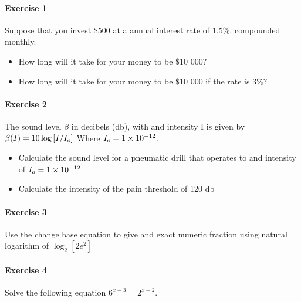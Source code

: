 \documentclass{tufte-handout}
\begin{document}
\paragraph{Exercise 1}
Suppose that you invest \$500 at a annual interest rate of 1.5\%, compounded monthly. 
\begin{itemize}
    \item How long will it take for your money to be \$10 000?
    \item How long will it take for your money to be \$10 000 if the rate is 3\%?
\end{itemize}

\noindent\makebox[\linewidth]{\rule{\textwidth}{0.4pt}}

\paragraph{Exercise 2}
The sound level $\beta$ in decibels (db), with and intensity I is given by $\beta(I)=10\log\qty[I/I_o]$ Where $I_o=\num{1d-12}$.
\begin{itemize}
    \item Calculate the sound level for a pneumatic drill that operates to and intensity of $I_o=\num{1d-12}$
    \item Calculate the intensity of the pain threshold of 120 db
\end{itemize}

\noindent\makebox[\linewidth]{\rule{\textwidth}{0.4pt}}

\paragraph{Exercise 3}
Use the change base equation to give and exact numeric fraction using natural logarithm of $\log_2[2e^2]$

\noindent\makebox[\linewidth]{\rule{\textwidth}{0.4pt}}

\paragraph{Exercise 4}
Solve the following equation $6^{x-3}=2^{x+2}$.
\end{document}
